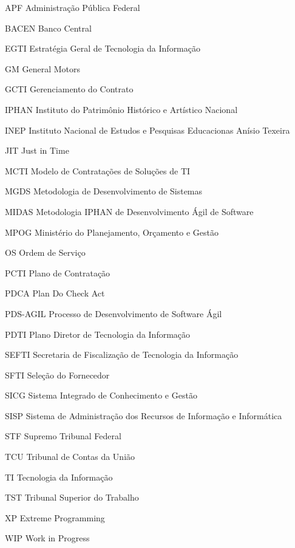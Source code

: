 \begin{siglas}
 \item[APF] Administração Pública Federal
  \item[BACEN] Banco Central
  \item[EGTI] Estratégia Geral de Tecnologia da Informação
  \item[GM] General Motors
  \item[GCTI] Gerenciamento do Contrato
  \item[IPHAN] Instituto do Patrimônio Histórico e Artístico Nacional
  \item[INEP] Instituto Nacional de Estudos e Pesquisas Educacionas Anísio Texeira
  \item[JIT] Just in Time
  \item[MCTI] Modelo de Contratações de Soluções de TI 
  \item[MGDS] Metodologia de Desenvolvimento de Sistemas
  \item[MIDAS] Metodologia IPHAN de Desenvolvimento Ágil de Software
  \item[MPOG] Ministério do Planejamento, Orçamento e Gestão
  \item[OS] Ordem de Serviço
  \item[PCTI] Plano de Contratação
  \item[PDCA] Plan Do Check Act
  \item[PDS-AGIL] Processo de Desenvolvimento de Software Ágil
  \item[PDTI] Plano Diretor de Tecnologia da Informação
  \item[SEFTI] Secretaria de Fiscalização de Tecnologia da Informação
  \item[SFTI] Seleção do Fornecedor
  \item[SICG] Sistema Integrado de Conhecimento e Gestão
  \item[SISP] Sistema de Administração dos Recursos de Informação e Informática
  \item[STF] Supremo Tribunal Federal
  \item[TCU] Tribunal de Contas da União
  \item[TI] Tecnologia da Informação 
  \item[TST] Tribunal Superior do Trabalho
  \item[XP] Extreme Programming
  \item[WIP] Work in Progress
\end{siglas}
